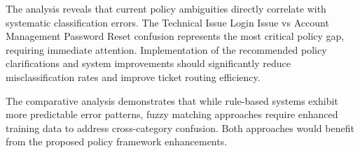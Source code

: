 \documentclass[11pt, a4paper]{article}
\begin{document}
The analysis reveals that current policy ambiguities directly correlate with systematic classification errors. The Technical Issue Login Issue vs Account Management Password Reset confusion represents the most critical policy gap, requiring immediate attention. Implementation of the recommended policy clarifications and system improvements should significantly reduce misclassification rates and improve ticket routing efficiency.

The comparative analysis demonstrates that while rule-based systems exhibit more predictable error patterns, fuzzy matching approaches require enhanced training data to address cross-category confusion. Both approaches would benefit from the proposed policy framework enhancements.
\end{document}
